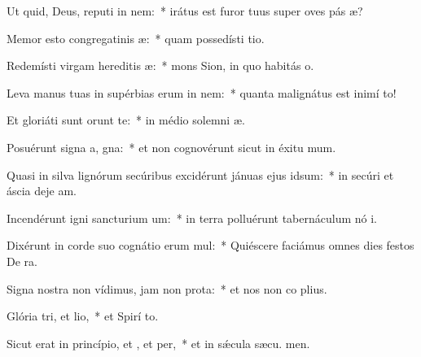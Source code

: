 \item Ut quid, Deus, reputi in nem:~* irátus est furor tuus super oves pás æ?
\item Memor esto congregatinis æ:~* quam possedísti  tio.
\item Redemísti virgam hereditis æ:~* mons Sion, in quo habitás  o.
\item Leva manus tuas in supérbias erum in nem:~* quanta malignátus est inimí  to!
\item Et gloriáti sunt  orunt te:~* in médio solemni æ.
\item Posuérunt signa a, gna:~* et non cognovérunt sicut in éxitu  mum.
\item Quasi in silva lignórum secúribus excidérunt jánuas ejus  idsum:~* in secúri et áscia deje am.
\item Incendérunt igni sancturium um:~* in terra polluérunt tabernáculum nó i.
\item Dixérunt in corde suo cognátio erum mul:~* Quiéscere faciámus omnes dies festos De  ra.
\item Signa nostra non vídimus, jam non  prota:~* et nos non co plius.
\item Glória tri, et lio,~* et Spirí to.
\item Sicut erat in princípio, et , et per,~* et in sǽcula sæcu. men.
